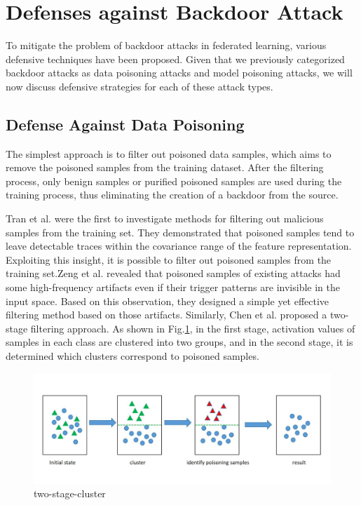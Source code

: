 \documentclass[conference]{IEEEtran}
\begin{document}
\section{Defenses against Backdoor Attack}
To mitigate the problem of backdoor attacks in
federated learning, various defensive techniques have been proposed.
Given that we previously categorized backdoor attacks as data poisoning
attacks and model poisoning attacks, we will now discuss defensive strategies
for each of these attack types.

\subsection{Defense Against Data Poisoning}
The simplest approach is to filter out poisoned data samples,
which aims to remove the poisoned samples from the training dataset.
After the filtering process, only benign samples or purified poisoned
samples are used during the training process, thus eliminating the
creation of a backdoor from the source.

Tran et al.\cite{b67} were the first to investigate methods for filtering out malicious
samples from the training set. They demonstrated that poisoned samples tend to
leave detectable traces within the covariance range of the feature representation.
Exploiting this insight, it is possible to filter out poisoned samples from
the training set.Zeng et al. \cite{b68} revealed that poisoned samples of
existing attacks had some high-frequency artifacts even if their trigger
patterns are invisible in the input space. Based on this observation,
they designed a simple yet effective filtering method based on those artifacts.
Similarly, Chen et al. \cite{b69}proposed a two-stage filtering approach.
As shown in Fig.\ref{fig9}, in the first stage, activation values of samples in each class are clustered
into two groups, and in the second stage, it is determined which clusters
correspond to poisoned samples.


\begin{figure}[htbp]
    \centerline{\includegraphics[width=0.8\linewidth,height=0.3\linewidth]{picture/two-stage-cluster.png}}
    \caption{two-stage-cluster}
    \label{fig9}
\end{figure}
\end{document}
